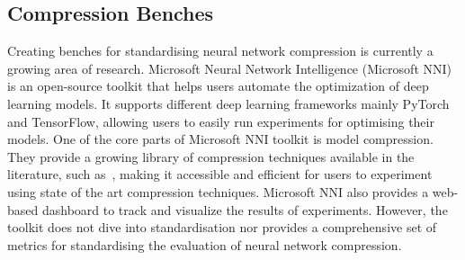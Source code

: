 







\subsection{Compression Benches}
Creating benches for standardising neural network compression is currently a growing area of research. %
%
Microsoft Neural Network Intelligence (Microsoft NNI)~\cite{nni2021} is an open-source toolkit that helps users automate the optimization of deep learning models. It supports different deep learning frameworks mainly PyTorch and TensorFlow, allowing users to easily run experiments for optimising their models. 
%
One of the core parts of Microsoft NNI toolkit is model compression. They provide a growing library of compression techniques available in the literature, such as~\cite{courbariaux2016binarized, esser2020learned, yang2022oneshot, frankle2019lottery}, making it accessible and efficient for users to experiment using state of the art compression techniques. Microsoft NNI also provides a web-based dashboard to track and visualize the results of experiments.
%
However, the toolkit does not dive into standardisation nor provides a comprehensive set of metrics for standardising the evaluation of neural network compression.

